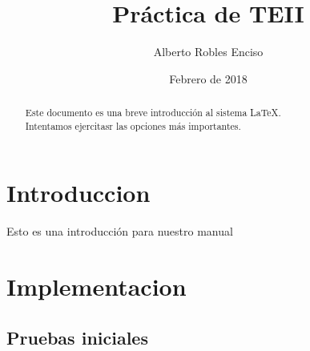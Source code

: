 \documentclass[8pt, A4]{article}    %
\title{Práctica de TEII}
\author{Alberto Robles Enciso}
\date{Febrero de 2018}
\begin{document}
\maketitle

\begin{abstract}
Este documento es una breve introducción al sistema \LaTeX.
\\Intentamos ejercitasr las opciones más importantes.
\end{abstract}


\tableofcontents

\newpage

\section{Introduccion}
Esto es una introducción para nuestro manual 

\section{Implementacion}

\subsection{Pruebas iniciales}
\end{document}
